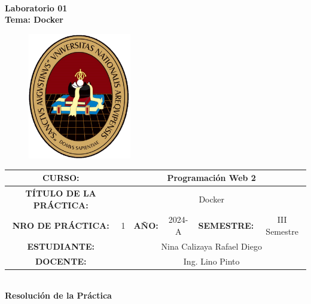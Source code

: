 \documentclass{article}
\begin{document}


\begin{center}
	\Huge \textbf{\\  \Large Laboratorio 01 \\ \Large Tema: Docker}
\end{center}


\begin{figure}[htbp]
  \centering
  \includegraphics[width=0.4\textwidth]{img/logoUnsa.png}
\end{figure}


\noindent
\renewcommand{\arraystretch}{2}
\begin{table}[h]
\centering
\begin{tabular}{|c|c|c|c|c|c||}
\hline
\multicolumn{1}{|c|}{\textbf{\scriptsize CURSO:}} & \multicolumn{5}{|c|}{\small Programación Web 2} \\ \hline
\multicolumn{1}{|c|}{\textbf{\scriptsize TÍTULO DE LA PRÁCTICA:}} & \multicolumn{5}{|c|}{\small Docker} \\ \hline
\multicolumn{1}{|c|}{\textbf{\scriptsize NRO DE PRÁCTICA:}} & \multicolumn{1}{|c|}{\small 1}& \multicolumn{1}{|c|}{\textbf{\footnotesize AÑO:}} & \multicolumn{1}{|c|}{\small 2024-A} & \multicolumn{1}{|c|}{\textbf{\footnotesize SEMESTRE:}} & \multicolumn{1}{|c|}{\small III Semestre} \\ \hline \multicolumn{1}{|c|}{\textbf{\scriptsize ESTUDIANTE:}} & \multicolumn{5}{|c|}{\small Nina Calizaya Rafael Diego} \\ \hline  \multicolumn{1}{|c|}{\textbf{\scriptsize DOCENTE:}} & \multicolumn{5}{|c|}{\small Ing. Lino Pinto} \\ \hline
\end{tabular}
\end{table}

\clearpage
\begin{center}
	\Huge \textbf{\\ \Large Resolución de la Práctica \\}
\end{center}
\end{document}
